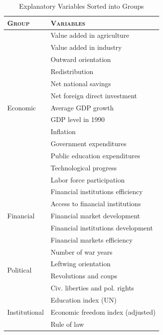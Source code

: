 \begin{refsection}
\begin{subappendices}
    \clearpage
    \begin{table}[ht!]
    \footnotesize
    \caption{Explanatory Variables Sorted into Groups}
    \label{ch3tab:groups}
    \centering
    \begin{tabular}{ll}
      \toprule
      \textsc{Group} & \textsc{Variables} \\
      \midrule
      \multirow{13}{*}{Economic}   & Value added in agriculture \\
                    & Value added in industry \\
                    & Outward orientation \\
                    & Redistribution \\
                    & Net national savings  \\
                    & Net foreign direct investment \\
                    & Average GDP growth \\
                    & GDP level in 1990 \\
                    & Inflation \\
                    & Government expenditures \\
                    & Public education expenditures \\
                    & Technological progress \\
                    & Labor force participation \\
    
      \midrule
      \multirow{5}{*}{Financial}   & Financial institutions efficiency \\
                    & Access to financial institutions  \\ 
                    & Financial market development \\
                    & Financial institutions development \\
                    & Financial markets efficiency \\
        
      \midrule
      \multirow{4}{*}{Political}  & Number of war years  \\
                    & Leftwing orientation \\
                    & Revolutions and coups \\
                    & Civ. liberties and pol. rights \\
    
      \midrule
      \multirow{3}{*}{Institutional}  & Education index (UN) \\
                    & Economic freedom index (adjusted) \\
                    & Rule of law \\
    

\end{tabular}
\end{table}
\end{subappendices}
\end{refsection}
